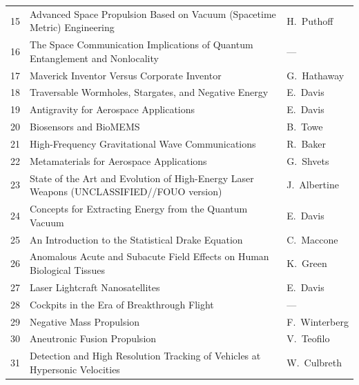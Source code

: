 \documentclass[aps,prd,twocolumn,superscriptaddress,nofootinbib,floatfix]{revtex4-2}
\begin{document}
\begin{table}[htbp]
\begin{tabular}{@{}rll@{}}
15 & \parbox[t]{0.68\textwidth}{\strut Advanced Space Propulsion Based on Vacuum (Spacetime Metric) Engineering\strut} &
  H.\ Puthoff \\
16 & \parbox[t]{0.68\textwidth}{\strut The Space Communication Implications of Quantum Entanglement and Nonlocality\strut}
  & --- \\
17 & \parbox[t]{0.68\textwidth}{\strut Maverick Inventor Versus Corporate Inventor\strut} & G.\ Hathaway \\
18 & \parbox[t]{0.68\textwidth}{\strut Traversable Wormholes, Stargates, and Negative Energy\strut} & E.\ Davis \\
19 & \parbox[t]{0.68\textwidth}{\strut Antigravity for Aerospace Applications\strut} & E.\ Davis \\
20 & \parbox[t]{0.68\textwidth}{\strut Biosensors and BioMEMS\strut} & B.\ Towe \\
21 & \parbox[t]{0.68\textwidth}{\strut High-Frequency Gravitational Wave Communications\strut} & R.\ Baker \\
22 & \parbox[t]{0.68\textwidth}{\strut Metamaterials for Aerospace Applications\strut} & G.\ Shvets \\
23 & \parbox[t]{0.68\textwidth}{\strut State of the Art and Evolution of High-Energy Laser Weapons
  (UNCLASSIFIED//FOUO version)\strut} & J.\ Albertine \\
24 & \parbox[t]{0.68\textwidth}{\strut Concepts for Extracting Energy from the Quantum Vacuum\strut} & E.\ Davis \\
25 & \parbox[t]{0.68\textwidth}{\strut An Introduction to the Statistical Drake Equation\strut} & C.\ Maccone \\
26 & \parbox[t]{0.68\textwidth}{\strut Anomalous Acute and Subacute Field Effects on Human Biological Tissues\strut} &
  K.\ Green \\
27 & \parbox[t]{0.68\textwidth}{\strut Laser Lightcraft Nanosatellites\strut} & E.\ Davis \\
28 & \parbox[t]{0.68\textwidth}{\strut Cockpits in the Era of Breakthrough Flight\strut} & --- \\
29 & \parbox[t]{0.68\textwidth}{\strut Negative Mass Propulsion\strut} & F.\ Winterberg \\
30 & \parbox[t]{0.68\textwidth}{\strut Aneutronic Fusion Propulsion\strut} & V.\ Teofilo \\
31 & \parbox[t]{0.68\textwidth}{\strut Detection and High Resolution Tracking of Vehicles at Hypersonic Velocities\strut} &
  W.\ Culbreth \\

\end{tabular}
\end{table}
\end{document}
